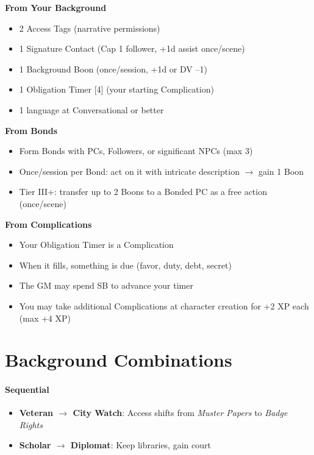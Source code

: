 \begin{tcolorbox}[colback=blue!5!white,colframe=blue!75!black,title=Backgrounds, Bonds \& Complications at a Glance,fonttitle=\bfseries,breakable]
\textbf{From Your Background}
\begin{itemize}
\item 2 Access Tags (narrative permissions)
\item 1 Signature Contact (Cap 1 follower, +1d assist once/scene)
\item 1 Background Boon (once/session, +1d or DV --1)
\item 1 Obligation Timer [4] (your starting Complication)
\item 1 language at Conversational or better
\end{itemize}

\textbf{From Bonds}
\begin{itemize}
\item Form Bonds with PCs, Followers, or significant NPCs (max 3)
\item Once/session per Bond: act on it with intricate description $\rightarrow$ gain 1 Boon
\item Tier III+: transfer up to 2 Boons to a Bonded PC as a free action (once/scene)
\end{itemize}

\textbf{From Complications}
\begin{itemize}
\item Your Obligation Timer is a Complication
\item When it fills, something is due (favor, duty, debt, secret)
\item The GM may spend SB to advance your timer
\item You may take additional Complications at character creation for +2 XP each (max +4 XP)
\end{itemize}
\end{tcolorbox}

\section{Background Combinations}

\paragraph{Sequential}
\begin{itemize}
\item \textbf{Veteran $\rightarrow$ City Watch}: Access shifts from \textit{Muster Papers} to \textit{Badge Rights}
\item \textbf{Scholar $\rightarrow$ Diplomat}: Keep libraries, gain court
\end{itemize}

